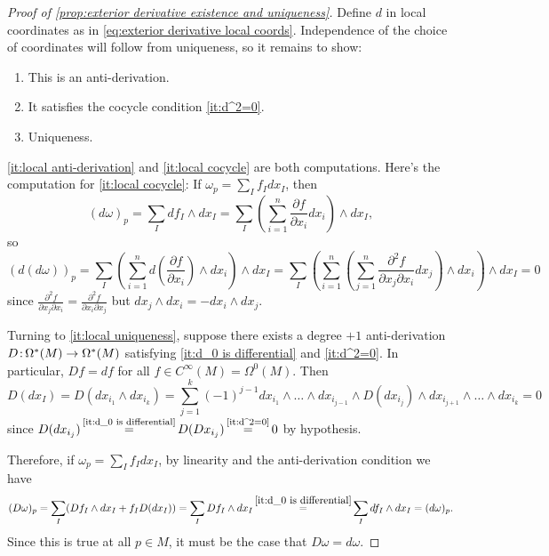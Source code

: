 \begin{proof}[Proof of \cref{prop:exterior derivative existence and uniqueness}]
	Define $d$ in local coordinates as in \eqref{eq:exterior derivative local coords}. Independence of the choice of coordinates will follow from uniqueness, so it remains to show:
	\begin{enumerate}[label=(\alph*)]
		\item \label{it:local anti-derivation} This is an anti-derivation.
		\item \label{it:local cocycle} It satisfies the cocycle condition \ref{it:d^2=0}.
		\item \label{it:local uniqueness} Uniqueness.
	\end{enumerate}
	
	\ref{it:local anti-derivation} and \ref{it:local cocycle} are both computations. Here's the computation for \ref{it:local cocycle}: If $\omega_p = \sum_I f_I dx_I$, then 
	\[
		(d\omega)_p = \sum_I df_I \wedge dx_I = \sum_I \left( \sum_{i=1}^n \frac{\partial f}{\partial x_i} dx_i\right) \wedge dx_I,
	\]
	so
	\[
		(d(d\omega))_p = \sum_I \left( \sum_{i=1}^n d\left(\frac{\partial f}{\partial x_i}\right) \wedge dx_i\right) \wedge dx_I = \sum_I \left( \sum_{i=1}^n \left(\sum_{j=1}^n\frac{\partial^2 f}{\partial x_j\partial x_i} dx_j\right) \wedge dx_i\right) \wedge dx_I = 0
	\]
	since $\frac{\partial^2 f}{\partial x_j\partial x_i} = \frac{\partial^2 f}{\partial x_i\partial x_j}$ but $dx_j \wedge dx_i = - dx_i \wedge dx_j$.
	
	Turning to \ref{it:local uniqueness}, suppose there exists a degree $+1$ anti-derivation $D\colon\thinspace\!\! \Omega^\ast(M) \to \Omega^\ast(M)$ satisfying \ref{it:d_0 is differential} and \ref{it:d^2=0}. In particular, $Df = df$ for all $f \in C^\infty(M) = \Omega^0(M)$. Then
	\[
		D(dx_I) = D(dx_{i_1} \wedge dx_{i_k}) = \sum_{j=1}^k (-1)^{j-1} dx_{i_1} \wedge \dots \wedge dx_{i_{j-1}} \wedge D(dx_{i_j}) \wedge dx_{i_{j+1}} \wedge \dots \wedge dx_{i_k} = 0
	\]
	since $D(dx_{i_j}) \mathop{=}\limits^{\text{\ref{it:d_0 is differential}}} D(Dx_{i_j}) \mathop{=}\limits^{\text{\ref{it:d^2=0}}} 0$ by hypothesis.
	
	Therefore, if $\omega_p = \sum_I f_I dx_I$, by linearity and the anti-derivation condition we have
	\[
		(D\omega)_p = \sum_I (Df_I \wedge dx_I + f_I D(dx_I)) = \sum_I Df_I \wedge dx_I \mathop{=}^{\ref{it:d_0 is differential}} \sum_I df_I \wedge dx_I = (d\omega)_p.
	\]
	Since this is true at all $p \in M$, it must be the case that $D\omega = d\omega$.
\end{proof}

